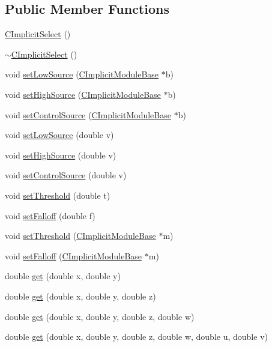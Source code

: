 \subsection*{Public Member Functions}
\begin{DoxyCompactItemize}
\item 
\hyperlink{classanl_1_1CImplicitSelect_ad88422b1f6238bf1ff219d656aebc725}{CImplicitSelect} ()
\item 
\hyperlink{classanl_1_1CImplicitSelect_a5cea97a9db75a1794ebdb5fba8dd3423}{$\sim$CImplicitSelect} ()
\item 
void \hyperlink{classanl_1_1CImplicitSelect_af86352376c12f94af9737e8bcd721289}{setLowSource} (\hyperlink{classanl_1_1CImplicitModuleBase}{CImplicitModuleBase} $\ast$b)
\item 
void \hyperlink{classanl_1_1CImplicitSelect_a6889e3f6cd3b853f6bea4321b6e09a5a}{setHighSource} (\hyperlink{classanl_1_1CImplicitModuleBase}{CImplicitModuleBase} $\ast$b)
\item 
void \hyperlink{classanl_1_1CImplicitSelect_af51e0883116835292269ee79bc10cdbb}{setControlSource} (\hyperlink{classanl_1_1CImplicitModuleBase}{CImplicitModuleBase} $\ast$b)
\item 
void \hyperlink{classanl_1_1CImplicitSelect_ae69159b3ba84196cc2eac9ddba699ab7}{setLowSource} (double v)
\item 
void \hyperlink{classanl_1_1CImplicitSelect_abb663dac9e7fd8d2ee4d56cf040a3500}{setHighSource} (double v)
\item 
void \hyperlink{classanl_1_1CImplicitSelect_abd63ca67ec274d342ce65139a9f8b1f2}{setControlSource} (double v)
\item 
void \hyperlink{classanl_1_1CImplicitSelect_a6b4904a00914e04dfcb29fac72310485}{setThreshold} (double t)
\item 
void \hyperlink{classanl_1_1CImplicitSelect_afa089ae06f40576ebe9f78bc298e3b05}{setFalloff} (double f)
\item 
void \hyperlink{classanl_1_1CImplicitSelect_a1e3b97dab8c4d988cb91f0ad2cdbf72b}{setThreshold} (\hyperlink{classanl_1_1CImplicitModuleBase}{CImplicitModuleBase} $\ast$m)
\item 
void \hyperlink{classanl_1_1CImplicitSelect_a0fcfd3dc21c5885e11078d908e4b2e65}{setFalloff} (\hyperlink{classanl_1_1CImplicitModuleBase}{CImplicitModuleBase} $\ast$m)
\item 
double \hyperlink{classanl_1_1CImplicitSelect_a0bc7db92ebc00afd8d195c31c207b234}{get} (double x, double y)
\item 
double \hyperlink{classanl_1_1CImplicitSelect_a324bded1a066192e2831cd7d80063cbc}{get} (double x, double y, double z)
\item 
double \hyperlink{classanl_1_1CImplicitSelect_ac0b010e48784974a4c7d9639a9a6f84e}{get} (double x, double y, double z, double w)
\item 
double \hyperlink{classanl_1_1CImplicitSelect_ab66ac3d292721897bb15009585dc4190}{get} (double x, double y, double z, double w, double u, double v)
\end{DoxyCompactItemize}
